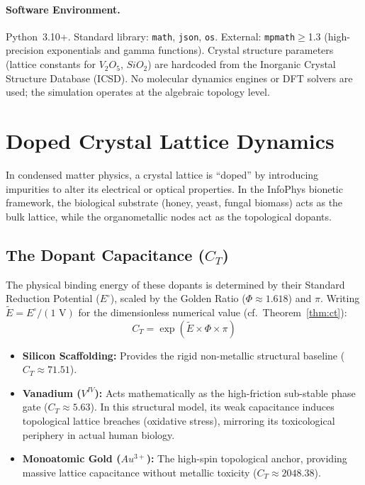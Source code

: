 \paragraph{Software Environment.}
Python~3.10+. Standard library: \texttt{math}, \texttt{json}, \texttt{os}. External: \texttt{mpmath}$\geq$1.3 (high-precision exponentials and gamma functions). Crystal structure parameters (lattice constants for $V_2O_5$, $SiO_2$) are hardcoded from the Inorganic Crystal Structure Database (ICSD). No molecular dynamics engines or DFT solvers are used; the simulation operates at the algebraic topology level.

\section{Doped Crystal Lattice Dynamics}

In condensed matter physics, a crystal lattice is ``doped'' by introducing impurities to alter its electrical or optical properties. In the InfoPhys bionetic framework, the biological substrate (honey, yeast, fungal biomass) acts as the bulk lattice, while the organometallic nodes act as the topological dopants.

\subsection{The Dopant Capacitance ($C_T$)}
The physical binding energy of these dopants is determined by their Standard Reduction Potential ($E^\circ$), scaled by the Golden Ratio ($\Phi \approx 1.618$) and $\pi$. Writing $\tilde{E} = E^\circ / (1\text{ V})$ for the dimensionless numerical value (cf.\ Theorem~\ref{thm:ct}):
\begin{equation}
    C_T = \exp(\tilde{E} \times \Phi \times \pi)
\end{equation}

\begin{itemize}
    \item \textbf{Silicon Scaffolding:} Provides the rigid non-metallic structural baseline ($C_T \approx 71.51$).
    \item \textbf{Vanadium ($V^{IV}$):} Acts mathematically as the high-friction sub-stable phase gate ($C_T \approx 5.63$). In this structural model, its weak capacitance induces topological lattice breaches (oxidative stress), mirroring its toxicological periphery in actual human biology.
    \item \textbf{Monoatomic Gold ($Au^{3+}$):} The high-spin topological anchor, providing massive lattice capacitance without metallic toxicity ($C_T \approx 2048.38$).
\end{itemize}

